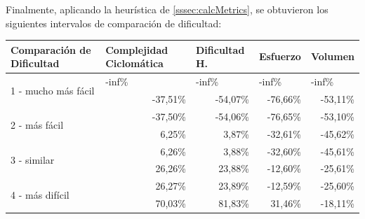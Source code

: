 \documentclass[letterpaper,12pt]{article}
\begin{document}
Finalmente, aplicando la heurística de \ref{sssec:calcMetrics}, se obtuvieron los siguientes intervalos de comparación de dificultad:
\begin{table}[H]
  \centering
  \begin{tabular}{|l|r|r|r|r|}
    \hline
    \textbf{Comparación de Dificultad}     & \multicolumn{1}{l|}{\textbf{Complejidad Ciclomática}} & \multicolumn{1}{l|}{\textbf{Dificultad H.}} & \multicolumn{1}{l|}{\textbf{Esfuerzo}} & \multicolumn{1}{l|}{\textbf{Volumen}} \\ \hline
    \multirow{2}{*}{1 - mucho más fácil}   & \multicolumn{1}{l|}{-inf\%}                           & \multicolumn{1}{l|}{-inf\%}                 & \multicolumn{1}{l|}{-inf\%}            & \multicolumn{1}{l|}{-inf\%}           \\ \cline{2-5}
                                           & -37,51\%                                              & -54,07\%                                    & -76,66\%                               & -53,11\%                              \\ \hline
    \multirow{2}{*}{2 - más fácil}         & -37,50\%                                              & -54,06\%                                    & -76,65\%                               & -53,10\%                              \\ \cline{2-5}
                                           & 6,25\%                                                & 3,87\%                                      & -32,61\%                               & -45,62\%                              \\ \hline
    \multirow{2}{*}{3 - similar}           & 6,26\%                                                & 3,88\%                                      & -32,60\%                               & -45,61\%                              \\ \cline{2-5}
                                           & 26,26\%                                               & 23,88\%                                     & -12,60\%                               & -25,61\%                              \\ \hline
    \multirow{2}{*}{4 - más difícil}       & 26,27\%                                               & 23,89\%                                     & -12,59\%                               & -25,60\%                              \\ \cline{2-5}
                                           & 70,03\%                                               & 81,83\%                                     & 31,46\%                                & -18,11\%                              \\ \hline

\end{tabular}
\end{table}
\end{document}
